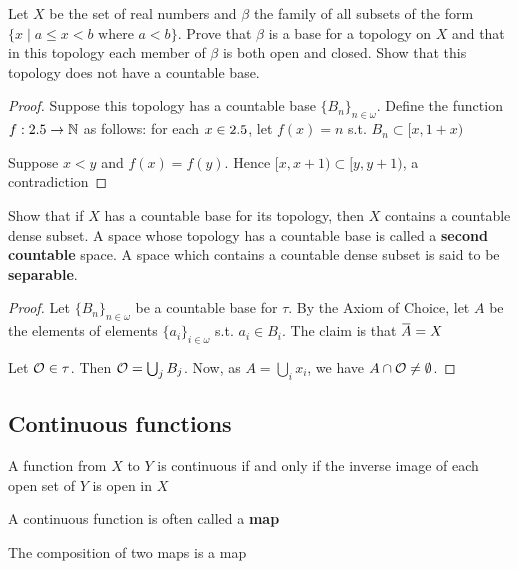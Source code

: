 \documentclass[11pt]{article}
\begin{document}
\begin{exercise}
\label{ex2.1.11}
Let \(X\) be the set of real numbers and \(\beta\) the family of all subsets of the
form \(\{x\mid a\le x<b\text{ where }a<b\}\). Prove that \(\beta\) is a base for a
topology on \(X\) and that in this topology each member of \(\beta\) is both open
and closed. Show that this topology does not have a countable base.
\end{exercise}

\begin{proof}
Suppose this topology has a countable base \(\{B_n\}_{n\in\omega}\). Define
the function \(f:2.5\to\mathbb{N}\) as follows: for each \(x\in2.5\), let \(f(x)=n\)
s.t. \(B_n\subset[x,1+x)\)

Suppose \(x<y\) and \(f(x)=f(y)\). Hence \([x,x+1)\subset[y,y+1)\), a
contradiction 
\end{proof}

\begin{exercise}
\label{ex2.1.12}
Show that if \(X\) has a countable base for its topology, then \(X\)
contains a countable dense subset. A space whose topology has a countable
base is called a \textbf{second countable} space. A space which contains a countable
dense subset is said to be \textbf{separable}.
\end{exercise}

\begin{proof}
Let \(\{B_n\}_{n\in\omega}\) be a countable base for \(\tau\).  By the Axiom of
Choice, let \(A\) be the elements of elements \(\{a_i\}_{i\in\omega}\) s.t.
\(a_i\in B_i\). The claim is that \(\bbar{A}=X\)

Let \(\mathcal{O}\in\tau\). Then \(\mathcal{O}=\bigcup_jB_j\). Now, as
\(A=\bigcup_ix_i\), we have \(A\cap\mathcal{O}\neq\emptyset\).
\end{proof}

\subsection{Continuous functions}
\label{sec:org90f5578}
\begin{theorem}[]
\label{thm2.6}
A function from \(X\) to \(Y\) is continuous if and only if the inverse image
of each open set of \(Y\) is open in \(X\)
\end{theorem}

A continuous function is often called a \textbf{map}

\begin{theorem}[]
The composition of two maps is a map
\end{theorem}
\end{document}
